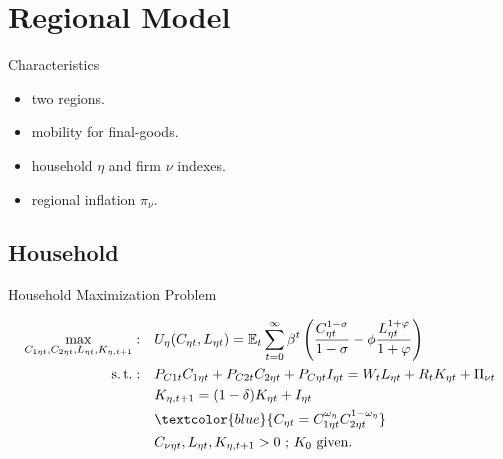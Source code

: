 \documentclass[
presentation.tex
]{subfiles}
\begin{document}
\section{Regional Model}


\begin{frame}{Characteristics}
	
	\begin{itemize}
		
		\item two regions.
		
		\item mobility for final-goods.
		
		\item household $\eta$ and firm $\nu$ indexes.
		
		\item regional inflation $\pi_{\nu}$.
		
	\end{itemize}
	
\end{frame}


\subsection{Household}

\begin{frame}{Household Maximization Problem}
	
\begin{align}
	\max_{C_{1\eta t}, C_{2\eta t}, L_{\eta t},K_{\eta, t+1}}: \quad & U_{\eta}(C_{\eta t},L_{\eta t}) = \E \sum_{t=0}^{\infty} \beta^t \left(\frac{C_{\eta t}^{1-\sigma}}{1-\sigma} - \phi \frac{L_{\eta t}^{1+\varphi}}{1+\varphi} \right) \label{eq:reg-utility-function-0} \\
	\st: \quad & P_{C1t} C_{1\eta t} + P_{C2t} C_{2\eta t} + P_{C\eta t} I_{\eta t} = W_t L_{\eta t} + R_t K_{\eta t} + \Pi_{\nu t} \label{eq:reg-budget-constraint} \\
	\quad & K_{\eta, t+1} = (1-\delta)K_{\eta t} + I_{\eta t} \label{eq:reg-law-of-motion-for-capital} \\
	\quad & \textcolor{blue}{C_{\eta t} = C_{1\eta t}^{\omega_{\eta}} C_{2\eta t}^{1-\omega_{\eta}}}  \label{eq:reg-consumption-aggregation} \\
	\quad & C_{\nu\eta t}, L_{\eta t}, K_{\eta, t+1} > 0 \text{ ; $K_0$ given.} \nonumber
\end{align}
	
\end{frame}
\end{document}
